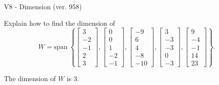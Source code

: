 \begin{exercise}
  \begin{exerciseTitle}V8 - Dimension (ver. 958)\end{exerciseTitle}
  \begin{exerciseStatement}
    Explain how to find the dimension of 
\[W=\mathrm{span}\ \left\{\left[\begin{array}{r}
3 \\
-2 \\
-1 \\
2 \\
3
\end{array}\right] , \left[\begin{array}{r}
0 \\
0 \\
1 \\
-2 \\
-1
\end{array}\right] , \left[\begin{array}{r}
-9 \\
6 \\
4 \\
-8 \\
-10
\end{array}\right] , \left[\begin{array}{r}
3 \\
-3 \\
-3 \\
0 \\
-3
\end{array}\right] , \left[\begin{array}{r}
9 \\
-4 \\
-1 \\
14 \\
23
\end{array}\right]\right\}.\]



  \end{exerciseStatement}
  \begin{exerciseAnswer}
   The dimension of \(W\) is  \(3\).
  


  \end{exerciseAnswer}
\end{exercise}